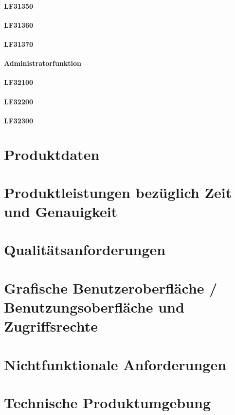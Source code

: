 \documentclass[a4paper,11pt]{article}             %
\begin{document}
			\paragraph{LF31350}
			\paragraph{LF31360}
			\paragraph{LF31370}
		
		\paragraph{Administratorfunktion}
			\paragraph{LF32100}
			\paragraph{LF32200}
			\paragraph{LF32300}



\section{Produktdaten}
\section{Produktleistungen bezüglich Zeit und Genauigkeit}
\section{Qualitätsanforderungen}
\section{Grafische Benutzeroberfläche / Benutzungsoberfläche und Zugriffsrechte}
\section{Nichtfunktionale Anforderungen}
\section{Technische Produktumgebung}
\end{document}
